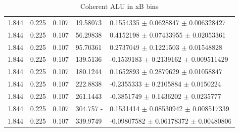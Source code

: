 \begin{table}[!h]
\begin{center}
\begin{tabular}{||l|l|l|l|l||}
         \hline
        1.844 & 0.225 & 0.107 & 19.58073  & 0.1554335   $\pm$   0.0628847   
$\pm$   0.006328427  \\
        1.844 & 0.225 & 0.107 &   56.29838  & 0.4152198   $\pm$   0.07433955  $\pm$   0.02053361 \\
        1.844 & 0.225 & 0.107 &   95.70361  & 0.2737049   $\pm$   0.1221503   $\pm$   0.01548828 \\
        1.844 & 0.225 & 0.107 &  139.5136  & -0.1539183  $\pm$   0.2139162   $\pm$   0.009511429 \\
        1.844 & 0.225 & 0.107 &   180.1244  & 0.1652893   $\pm$   0.2879629   $\pm$   0.01058847 \\
        1.844 & 0.225 & 0.107 &  222.8838  & -0.2355333  $\pm$   0.2105884   $\pm$   0.0150224   \\
        1.844 & 0.225 & 0.107 &  261.1443  & -0.3851749  $\pm$   0.1436202   $\pm$   0.0235777   \\
        1.844 & 0.225 & 0.107 &  304.757  -& 0.1531414   $\pm$   0.08530942  $\pm$   0.008517339 \\
        1.844 & 0.225 & 0.107 &  339.9749  & -0.09807582 $\pm$   0.06178372  $\pm$   0.00480806  \\

         \hline  
         \hline
      \end{tabular}
      \caption{Coherent ALU in xB bins}
      \label{table:Coh_xB_BSA}
   \end{center}
\end{table}                        

